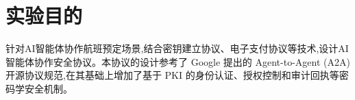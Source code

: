 \section{实验目的}
针对AI智能体协作航班预定场景,结合密钥建立协议、电子支付协议等技术,设计AI智能体协作安全协议。本协议的设计参考了 Google 提出的 Agent-to-Agent (A2A) 开源协议规范\cite{A2A},在其基础上增加了基于 PKI 的身份认证、授权控制和审计回执等密码学安全机制。
